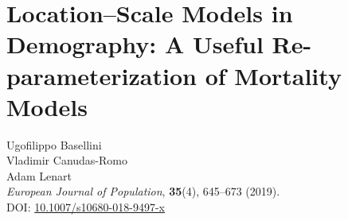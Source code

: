 \documentclass[Thesis]{subfiles}
\begin{document}
\newpage
\chapter{Location--Scale Models in Demography: A Useful Re-parameterization of Mortality Models}\label{Ch2}
\thispagestyle{empty}
\pagecolor{pagecolor}\afterpage{\nopagecolor}
\vspace{1cm}
\Large
Ugofilippo Basellini\\
Vladimir Canudas-Romo\\
Adam Lenart 
\vspace{2cm}
\textit{\\ European Journal of Population}, \textbf{35}(4), 645--673 (2019). \\
DOI: \href{https://link.springer.com/article/10.1007/s10680-018-9497-x}{\color{black}10.1007/s10680-018-9497-x}
\clearpage

\thispagestyle{empty}
\pagecolor{pagecolor}\afterpage{\nopagecolor}
\section*{}
\clearpage


\end{document}
